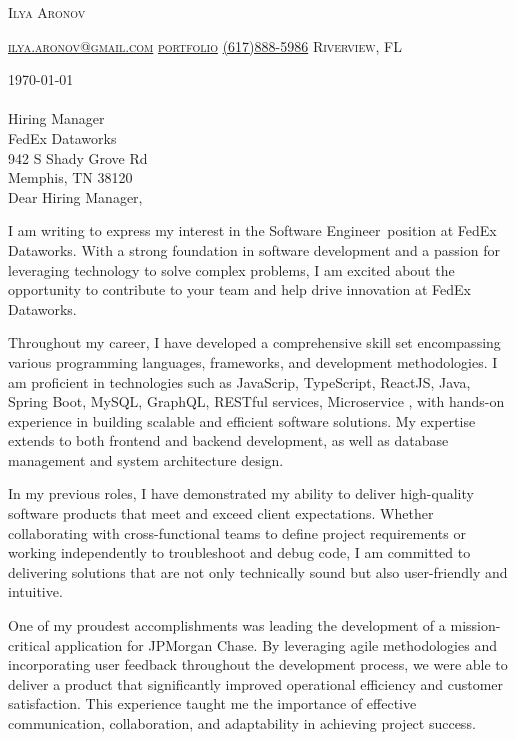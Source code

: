\documentclass[11pt]{letter}
\makeatletter
\def\myname{Ilya Aronov}
\def\myemail{ilya.aronov@gmail.com}
\def\portfolio{https://imaronov.github.io/}
\def\myphone{(617)888-5986}
\def\mylocation{Riverview, FL}
\def\previousCompany{JPMorgan Chase}
\def\possitionApplied{Software Engineer}
\def\hiringManager{Hiring Manager}
\def\companyName{FedEx Dataworks}
\def\companyAddress{942 S Shady Grove Rd}
\def\companyCity{Memphis, TN 38120}
\def\companySkills{JavaScrip, TypeScript, ReactJS, Java, Spring Boot, MySQL, GraphQL, RESTful services, Microservice }
\newcommand{\addressHeading}[4]{
    {#1}\\
    {#2}\\
    {#3}\\
    {#4}\\
}
\newcommand{\greeting}{
    \vspace{-0.1in}Dear \hiringManager,
}
\makeatother
\begin{document}
\AddToShipoutPictureBG{%
\color{gr}
\AtPageUpperLeft{\rule[-1.3in]{\paperwidth}{1.3in}}
}

\begin{center}
{\fontsize{28}{0}\selectfont\scshape \myname}

\fontsize{10}{0}\selectfont\scshape \href{mailto:\myemail}{\faEnvelope\enspace \myemail}\hfill
\fontsize{10}{0}\selectfont\scshape \href{\portfolio}{\faUser\enspace portfolio}\hfill
\fontsize{10}{0}\selectfont\scshape \href{tel:\myphone}{\faPhone\enspace \myphone}\hfill
\fontsize{10}{0}\selectfont\scshape \faMapMarker\enspace \mylocation
\end{center}

\vspace{0.2in}

\today
\\ \\
\addressHeading{\hiringManager}{\companyName}{\companyAddress}{\companyCity}

\greeting

I am writing to express my interest in the \possitionApplied\, position at \companyName.
With a strong foundation in software development and a passion for leveraging technology to solve complex problems,
I am excited about the opportunity to contribute to your team and help drive innovation at \companyName.

Throughout my career, I have developed a comprehensive skill set encompassing various programming languages, frameworks, and development methodologies.
I am proficient in technologies such as \companySkills, with hands-on experience in building scalable and efficient software solutions.
My expertise extends to both frontend and backend development, as well as database management and system architecture design.

In my previous roles, I have demonstrated my ability to deliver high-quality software products that meet and exceed client expectations.
Whether collaborating with cross-functional teams to define project requirements or working independently to troubleshoot and debug code,
I am committed to delivering solutions that are not only technically sound but also user-friendly and intuitive.

One of my proudest accomplishments was leading the development of a mission-critical application for \previousCompany.
By leveraging agile methodologies and incorporating user feedback throughout the development process, we were able to deliver a product that significantly improved operational efficiency and customer satisfaction.
This experience taught me the importance of effective communication, collaboration, and adaptability in achieving project success.
\end{document}
